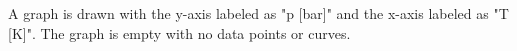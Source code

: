 A graph is drawn with the y-axis labeled as "p [bar]" and the x-axis labeled as "T [K]". The graph is empty with no data points or curves.